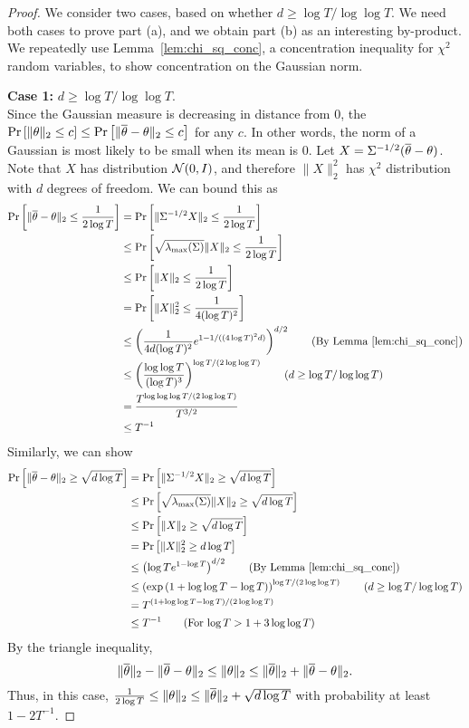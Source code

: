 \begin{proof}
  We consider two cases, based on whether $d \ge \log T/\log \log T$. We need both cases to prove part (a), and we obtain part (b) as an interesting by-product.
We repeatedly use
  Lemma~\ref{lem:chi_sq_conc}, a concentration inequality for $\chi^2$ random
  variables, to show concentration on the Gaussian norm.

  \textbf{Case 1:} $d \ge \log T/\log \log T$. \\
  Since the Gaussian measure is decreasing in
  distance from 0, the $\Pr\left[\|\theta\|_2 \le c\right] \le \Pr\left[\|\overline \theta - \theta\|_2
  \le c\right]$ for any $c$. In other words, the norm of a Gaussian is most likely to
  be small when its mean is 0. Let $X = \Sigma^{-1/2} (\overline \theta - \theta)$. Note that
  $X$ has distribution $\mathcal{N}(0, I)$, and therefore $\|X\|_2^2$ has $\chi^2$
  distribution with $d$ degrees of freedom. We can bound this as
  \begin{align*}
    \Pr\b{\|\pmt - \theta\|_2 \le \frac{1}{2\log T}}
    &= \Pr\b{\|\pvt^{-1/2}X\|_2 \le \frac{1}{2\log T}} \\
    &\le \Pr\b{\sqrt{\lambda_{\max}(\pvt)}\|X\|_2 \le \frac{1}{2\log T}} \\
    &\le \Pr\b{\|X\|_2 \le \frac{1}{2\log T}} \\
    &= \Pr\b{\|X\|_2^2 \le \frac{1}{4(\log T)^2}} \\
    &\le \p{\frac{1}{4d(\log T)^2} e^{1-1/((4\log T)^2 d)}}^{d/2} \tag{By
      Lemma~\ref{lem:chi_sq_conc}} \\
    &\le \p{\frac{\log \log T}{(\log T)^3}}^{\log T/(2\log \log T)} \tag{$d \ge
    \log T/\log \log T$} \\
    &= \frac{T^{\log \log \log T/(2 \log \log T)}}{T^{3/2}} \\
    &\le T^{-1}
  \end{align*}
  Similarly, we can show
  \begin{align*}
    \Pr\b{\|\pmt - \theta\|_2 \ge \sqrt{d\log T}}
    &= \Pr\b{\|\pvt^{-1/2}X\|_2 \ge \sqrt{d \log T}} \\
    &\le \Pr\b{\sqrt{\lambda_{\max}(\pvt)}\|X\|_2 \ge \sqrt{d \log T}} \\
    &\le \Pr\b{\|X\|_2 \ge \sqrt{d\log T}} \\
    &= \Pr\b{\|X\|_2^2 \ge d \log T} \\
    &\le \p{\log T e^{1-\log T}}^{d/2} \tag{By Lemma~\ref{lem:chi_sq_conc}} \\
    &\le \p{\exp\p{1 + \log \log T - \log T}}^{\log T/(2\log \log T)} \tag{$d
    \ge \log T/\log \log T$} \\
    &= T^{(1 + \log \log T - \log T)/(2\log \log T)} \\
    &\le T^{-1} \tag{For $\log T > 1 + 3 \log \log T$}
  \end{align*}
  By the triangle inequality,
  \[
    \|\overline \theta\|_2 - \|\overline \theta - \theta\|_2 \le \|\theta\|_2 \le \|\overline \theta\|_2 + \|\overline \theta -
    \theta\|_2.
  \]
  Thus, in this case, $\frac{1}{2\log T} \le \|\theta\|_2 \le \|\overline \theta\|_2 +
  \sqrt{d \log T}$ with probability at least $1-2T^{-1}$.


\end{proof}

